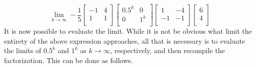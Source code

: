 \documentclass[titlepage]{article}
\begin{document}
\begin{equation*}
    \lim_{k\to\infty} -\frac{1}{5}
    \begin{bmatrix}
        -1 & 4\\
        1 & 1\\
    \end{bmatrix}
    \begin{bmatrix}
        0.5^k & 0\\
        0 & 1^k\\
    \end{bmatrix}
    \begin{bmatrix}
        1 & -4\\
        -1 & -1\\
    \end{bmatrix}
    \begin{bmatrix}
        6\\
        4\\
    \end{bmatrix}
\end{equation*}
It is now possible to evaluate the limit. While it is not be obvious what limit the entirety of the above expression approaches, all that is necessary is to evaluate the limits of $0.5^k$ and $1^k$ as $k\to\infty$, respectively, and then recompile the factorization. This can be done as follows.
\end{document}
